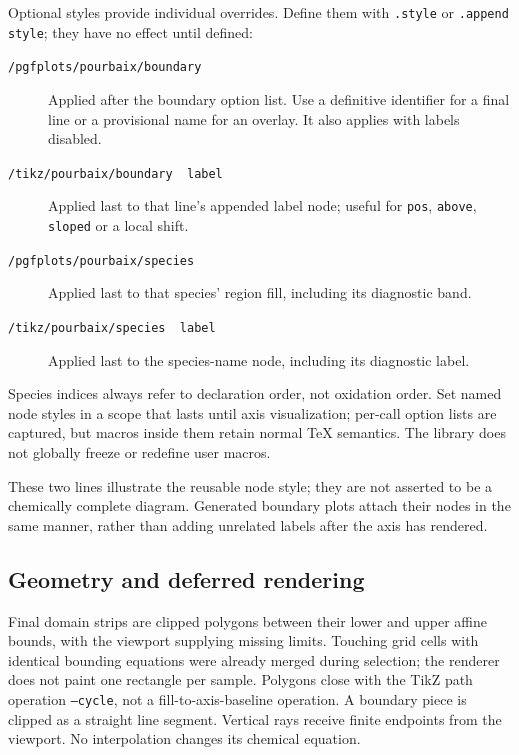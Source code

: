 \documentclass[a4paper,11pt]{ltxdoc}
\begin{document}
Optional styles provide individual overrides. Define them with \texttt{.style}
or \texttt{.append style}; they have no effect until defined:
\begin{description}
\item[\texttt{/pgfplots/pourbaix/boundary }]
  Applied after the boundary option list. Use a definitive identifier for a final
  line or a provisional name for an overlay. It also applies with labels disabled.
\item[\texttt{/tikz/pourbaix/boundary }\texttt{ label}]
  Applied last to that line's appended label node; useful for \texttt{pos},
  \texttt{above}, \texttt{sloped} or a local shift.
\item[\texttt{/pgfplots/pourbaix/species }]
  Applied last to that species' region fill, including its diagnostic band.
\item[\texttt{/tikz/pourbaix/species }\texttt{ label}]
  Applied last to the species-name node, including its diagnostic label.
\end{description}
Species indices always refer to declaration order, not oxidation order. Set
named node styles in a scope that lasts until axis visualization; per-call
option lists are captured, but macros inside them retain normal TeX semantics.
The library does not globally freeze or redefine user macros.

\begin{codeexample}[width=7cm]
\end{codeexample}
These two lines illustrate the reusable node style; they are not asserted to be
a chemically complete diagram. Generated boundary plots attach their nodes in
the same manner, rather than adding unrelated labels after the axis has rendered.

\subsection{Geometry and deferred rendering}
Final domain strips are clipped polygons between their lower and upper affine
bounds, with the viewport supplying missing limits. Touching grid cells with
identical bounding equations were already merged during selection; the renderer
does not paint one rectangle per sample. Polygons close with the TikZ path
operation \texttt{--cycle}, not a fill-to-axis-baseline operation. A boundary
piece is clipped as a straight line segment. Vertical rays receive finite
endpoints from the viewport. No interpolation changes its chemical equation.
\end{document}
